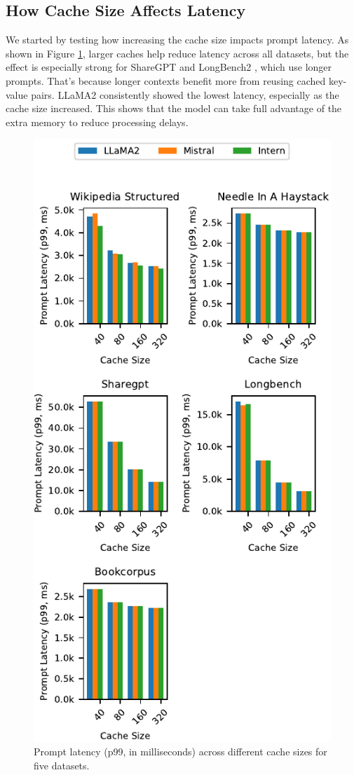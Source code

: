\documentclass[sigconf,nonacm]{acmart}
\begin{document}
\subsection{How Cache Size Affects Latency}
We started by testing how increasing the cache size impacts prompt latency. As shown in Figure \ref{fig1}, larger caches help reduce latency across all datasets, but the effect is especially strong for ShareGPT \cite{sharegpt} and LongBench2 \cite{longbenchv2}, which use longer prompts. That’s because longer contexts benefit more from reusing cached key-value pairs.
LLaMA2 \cite{touvron2023llama2} consistently showed the lowest latency, especially as the cache size increased. This shows that the model can take full advantage of the extra memory to reduce processing delays.
\begin{figure}[H]
    \centering
    \includegraphics[scale=0.75]{figure1_combined_latency.pdf}
    \caption{Prompt latency (p99, in milliseconds) across different cache sizes for five datasets.}
    \label{fig1}
\end{figure}
\end{document}

